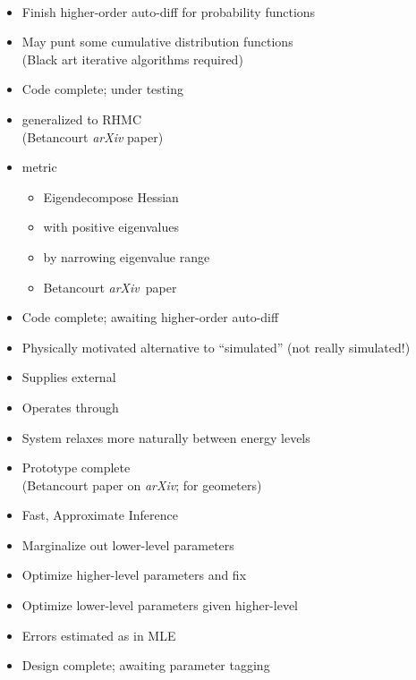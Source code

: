 \documentclass[10pt]{report}
\newcommand{\sld}[1]{\newpage{\noindent\LARGE \ \ \
    \textcolor{MidnightBlue}{\bfseries #1}}\vspace*{4pt}}
\newcommand{\spc}{\hspace*{0.25in}}
\newcommand{\myemph}[1]{{\color{MidnightBlue}{\bfseries #1}}}
\newcommand{\mypart}[2]{{\newpage 
    \mbox{ }
    \vfill
    \noindent\spc\color{MidnightBlue}{\LARGE\bfseries #1\\[10pt]\spc\Huge{#2}}
    \vfill\vfill}
  \mbox{ }}
\begin{document}
\mypart{Part III}{What's Next?}

\sld{Higher-Order Auto-diff}
\begin{itemize}
\item Finish higher-order auto-diff for probability functions
\item May punt some cumulative distribution functions
  \\
  {\footnotesize (Black art iterative algorithms required)}
  \vfill
\item Code complete; under testing
\end{itemize}

\sld{Riemannian Manifold HMC}
\begin{itemize}
\item \myemph{NUTS} generalized to RHMC
  \\ {\footnotesize (Betancourt {\slshape arXiv} paper)}
\item \myemph{SoftAbs} metric
  \vspace*{-4pt}
  \begin{itemize}\footnotesize
  \item Eigendecompose Hessian
  \item \myemph{positive definite} with positive eigenvalues
  \item \myemph{condition} by narrowing eigenvalue range
  \item Betancourt {\slshape arXiv}\ paper
  \end{itemize}
  \vfill
\item Code complete; awaiting higher-order auto-diff
\end{itemize}

\sld{Adiabatic Sampling}
\begin{itemize}
\item Physically motivated alternative to ``simulated''
  \myemph{annealing and tempering} (not really simulated!)
\item Supplies external \myemph{heat bath}
\item Operates through \myemph{contact manifold}
\item System relaxes more naturally between energy levels
  \vfill
\item Prototype complete
  \\ {\small (Betancourt paper on {\slshape arXiv}; for geometers)}
\end{itemize}

\sld{Maximum Marginal Likelihood}
\begin{itemize}
\item Fast, Approximate Inference
\item Marginalize out lower-level parameters
\item Optimize higher-level parameters and fix
\item Optimize lower-level parameters given higher-level
\item Errors estimated as in MLE
  \vfill
\item Design complete; awaiting parameter tagging
\end{itemize}
\end{document}
